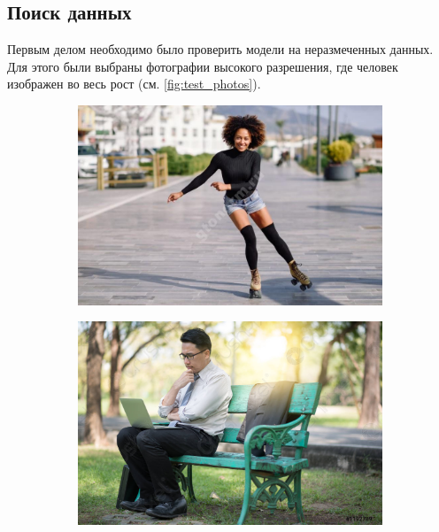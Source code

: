 \subsection{Поиск данных}

Первым делом необходимо было проверить модели на неразмеченных данных. Для этого были выбраны фотографии высокого разрешения, где человек изображен во весь рост (см. \autoref{fig:test_photos}).

\begin{figure}[h]
\begin{subfigure}[b]{.5\textwidth}
	\centering
	\includegraphics[width=\textwidth]{./images/Test/ролики2}
	\caption{ }
\end{subfigure}
\begin{subfigure}[b]{.5\textwidth}
	\centering
  \includegraphics[width=\textwidth]{./images/Test/скамека3}
  \caption{ }
\end{subfigure}

\end{figure}
